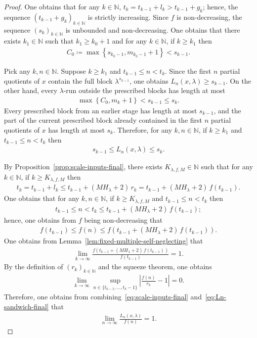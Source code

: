 \documentclass[10pt,a4paper]{amsart}
\begin{document}
\begin{proof}
One obtains that for any $k\in\mathbb{N}$, $t_k=t_{k-1}+l_k>t_{k-1}+g_k$; hence, the sequence $(t_{k-1}+g_k)_{k\in\mathbb{N}}$ is strictly increasing. Since $f$ is non-decreasing, the sequence $(s_k)_{k\in\mathbb{N}}$ is unbounded and non-decreasing. One obtains that there exists $k_1\in\mathbb{N}$ such that $k_1\geq k_0+1$ and for any $k\in\mathbb{N}$, if $k\geq k_1$ then
\begin{align*}
    C_0\coloneqq\max{\left\{s_{k_0-1},m_{k_0-1}+1\right\}}<s_{k-1}.
\end{align*}

Pick any $k,n\in\mathbb{N}$. Suppose $k\geq k_1$ and $t_{k-1}\leq n< t_k$. Since the first $n$ partial quotients of $x$ contain the full block $\lambda^{s_{k-1}}$, one obtains $L_n(x,\lambda)\geq s_{k-1}$. On the other hand, every $\lambda$-run outside the prescribed blocks has length at most
\begin{align*}
    \max{\left\{C_0,m_k+1\right\}}<s_{k-1}\leq s_k.
\end{align*}
Every prescribed block from an earlier stage has length at most $s_{k-1}$, and the part of the current prescribed block already contained in the first $n$ partial quotients of $x$ has length at most $s_k$. Therefore, for any $k,n\in\mathbb{N}$, if $k\geq k_1$ and $t_{k-1}\leq n< t_k$ then
\begin{align}
    \label{eq:Ln-sandwich-final}
    s_{k-1}
    \leq L_n(x,\lambda)
    \leq s_k.
\end{align}

By Proposition~\ref{prop:scale-inputs-final}, there exists $K_{\lambda,f,M}\in\mathbb{N}$ such that for any $k\in\mathbb{N}$, if $k\geq K_{\lambda,f,M}$ then 
\begin{align*}
    t_k=t_{k-1}+l_k
    \leq t_{k-1}+(MH_\lambda+2)\,r_k
    =t_{k-1}+(MH_\lambda+2)\, f(t_{k-1}).
\end{align*}
One obtains that for any $k,n\in\mathbb{N}$, if $k\geq K_{\lambda,f,M}$ and $t_{k-1}\leq n< t_k$ then
\begin{align*}
    t_{k-1}\leq n< t_k\leq t_{k-1}+(MH_\lambda+2)\,f(t_{k-1});
\end{align*}
hence, one obtains from $f$ being non-decreasing that
\begin{align*}
    f(t_{k-1})
    \leq f(n)
    \leq f(t_{k-1}+(MH_\lambda+2)\,f(t_{k-1})).
\end{align*}
One obtains from Lemma~\ref{lem:fixed-multiple-self-neglecting} that
\begin{align*}
    \lim_{k\to\infty}\frac{f(t_{k-1}+(MH_\lambda+2)\,f(t_{k-1}))}{f(t_{k-1})}
    =1.
\end{align*}
By the definition of $(r_k)_{k\in\mathbb{N}}$ and the squeeze theorem, one obtains
\begin{align*}
    \lim_{k\to\infty}\sup_{n\in\{t_{k-1},\ldots,t_k-1\}}
    \left|\frac{f(n)}{r_k}-1\right|
    =0.
\end{align*}
Therefore, one obtains from combining~\eqref{eq:scale-inputs-final} and~\eqref{eq:Ln-sandwich-final} that
\begin{align*}
    \lim_{n\to\infty}\frac{L_n(x,\lambda)}{f(n)}=1.
\end{align*}


\end{proof}
\end{document}
